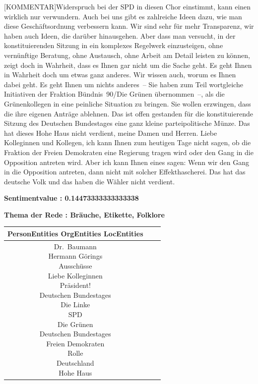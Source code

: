 \documentclass[a4paper,11pt]{article}
\begin{document}
[KOMMENTAR]Widerspruch bei der SPD
 in diesen Chor einstimmt, kann einen wirklich nur verwundern. Auch bei uns gibt es zahlreiche Ideen dazu, wie man diese Geschäftsordnung verbessern kann. Wir sind sehr für mehr Transparenz, wir haben auch Ideen, die darüber hinausgehen. Aber dass man versucht, in der konstituierenden Sitzung in ein komplexes Regelwerk einzusteigen, ohne vernünftige Beratung, ohne Austausch, ohne Arbeit am Detail leisten zu können, zeigt doch in Wahrheit, dass es Ihnen gar nicht um die Sache geht. Es geht Ihnen in Wahrheit doch um etwas ganz anderes. Wir wissen auch, worum es Ihnen dabei geht. Es geht Ihnen um nichts anderes – Sie haben zum Teil wortgleiche Initiativen der Fraktion Bündnis 90/Die Grünen übernommen –, als die Grünenkollegen in eine peinliche Situation zu bringen. Sie wollen erzwingen, dass die ihre eigenen Anträge ablehnen. Das ist offen gestanden für die konstituierende Sitzung des Deutschen Bundestages eine ganz kleine parteipolitische Münze. Das hat dieses Hohe Haus nicht verdient, meine Damen und Herren. Liebe Kolleginnen und Kollegen, ich kann Ihnen zum heutigen Tage nicht sagen, ob die Fraktion der Freien Demokraten eine Regierung tragen wird oder den Gang in die Opposition antreten wird. Aber ich kann Ihnen eines sagen: Wenn wir den Gang in die Opposition antreten, dann nicht mit solcher Effekthascherei. Das hat das deutsche Volk und das haben die Wähler nicht verdient.

\textbf{Sentimentvalue : 0.14473333333333338}

\textbf{Thema der Rede : Bräuche, Etikette, Folklore}
\vspace*{1cm}

\begin{table}[ht]
\centering
\begin{tabular}{||c | c | c||}
\hline
PersonEntities  OrgEntities  LocEntities \\ 

\hline\hline
\makecell{Dr. Baumann \\
Hermann Görings \\
Ausschüsse \\
Liebe Kolleginnen \\
} 
\makecell{Präsident! \\
Deutschen Bundestages \\
Die Linke \\
SPD \\
Die Grünen \\
Deutschen Bundestages \\
Freien Demokraten \\
} 
\makecell{Rolle \\
Deutschland \\
Hohe Haus \\
}\\
\hline
\end{tabular}
\end{table}
\clearpage
\end{document}
